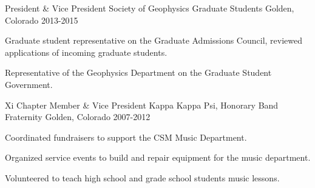 \begin{cventries}
  \cventry
    {President \& Vice President} %
    {Society of Geophysics Graduate Students} %
    {Golden, Colorado} %
    {2013-2015} %
    {
      \begin{cvitems} %
        \item {Graduate student representative on the Graduate Admissions Council, reviewed applications of incoming graduate students.}
        \item {Representative of the Geophysics Department on the Graduate Student Government.}
      \end{cvitems}
    }
    
  \cventry
    {Xi Chapter Member \& Vice President} %
    {Kappa Kappa Psi, Honorary Band Fraternity} %
    {Golden, Colorado} %
    {2007-2012} %
    {
      \begin{cvitems} %
        \item {Coordinated fundraisers to support the CSM Music Department.}
        \item {Organized service events to build and repair equipment for the music department.}
        \item {Volunteered to teach high school and grade school students music lessons.}
      \end{cvitems}
    }

\end{cventries}
